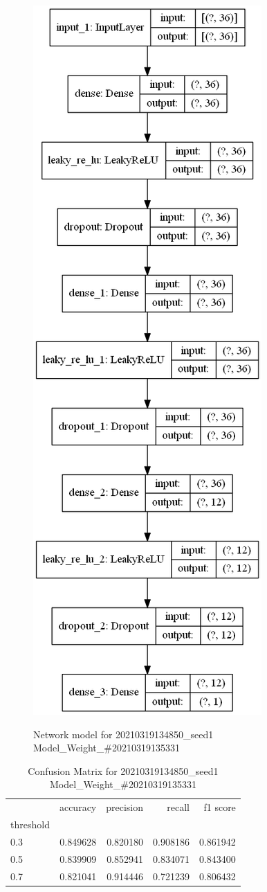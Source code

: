         \begin{figure}
        \caption{Network model for 20210319134850\_seed1 Model\_Weight\_\#20210319135331}
        \centering
            \includegraphics[width=0.5\linewidth]{20210319134850_seed1/ModelWeight20210319135331/model_struct.png}
        \label{fig:20210319134850seed1/ModelWeight20210319135331/modelstruct.png}
        \end{figure}
        \begin{table}
\centering
\caption{Confusion Matrix for 20210319134850\_seed1 Model\_Weight\_\#20210319135331}
\label{tab:conf_matr20210319134850seed1ModelWeight20210319135331}
\begin{tabular}{lrrrr}
\toprule
{} &  accuracy &  precision &    recall &  f1 score \\
threshold &           &            &           &           \\
\midrule
0.3       &  0.849628 &   0.820180 &  0.908186 &  0.861942 \\
0.5       &  0.839909 &   0.852941 &  0.834071 &  0.843400 \\
0.7       &  0.821041 &   0.914446 &  0.721239 &  0.806432 \\
\bottomrule
\end{tabular}
\end{table}
